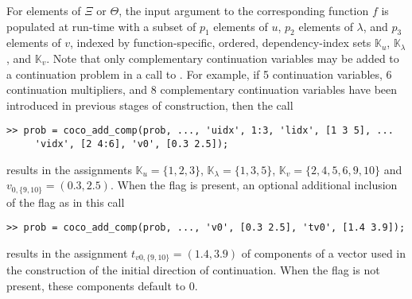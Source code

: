 For elements of $\Xi$ or $\Theta$, the input argument to the corresponding function $f$ is populated at run-time with a subset of $p_1$ elements of $u$, $p_2$ elements of $\lambda$, and $p_3$ elements of $v$, indexed by function-specific, ordered, dependency-index sets $\mathbb{K}_u$, $\mathbb{K}_\lambda$, and $\mathbb{K}_v$. Note that only complementary continuation variables may be added to a continuation problem in a call to . For example, if 5 continuation variables, 6 continuation multipliers, and 8 complementary continuation variables have been introduced in previous stages of construction, then the call
\begin{lstlisting}[language=coco-highlight]
>> prob = coco_add_comp(prob, ..., 'uidx', 1:3, 'lidx', [1 3 5], ...
     'vidx', [2 4:6], 'v0', [0.3 2.5]);
\end{lstlisting}
results in the assignments $\mathbb{K}_u=\{1,2,3\}$, $\mathbb{K}_\lambda=\{1,3,5\}$, $\mathbb{K}_v=\{2,4,5,6,9,10\}$ and $v_{0,\{9,10\}}=(0.3,2.5)$. When the  flag is present, an optional additional inclusion of the flag  as in this call
\begin{lstlisting}[language=coco-highlight]
>> prob = coco_add_comp(prob, ..., 'v0', [0.3 2.5], 'tv0', [1.4 3.9]);
\end{lstlisting}
results in the assignment $t_{v0,\{9,10\}}=(1.4,3.9)$ of components of a vector used in the construction of the initial direction of continuation. When the  flag is not present, these components default to $0$.
 
